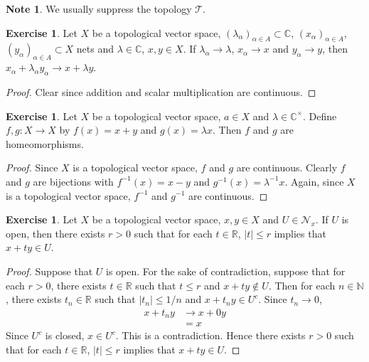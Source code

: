 \documentclass[12pt]{amsart}
\theoremstyle{definition}
\newtheorem{note}[definition]{Note}
\newtheorem{ex}[definition]{Exercise}
\newcommand{\al}{\alpha}
\newcommand{\lam}{\lambda}
\newcommand{\C}{\mathbb{C}}
\newcommand{\N}{\mathbb{N}}
\newcommand{\R}{\mathbb{R}}
\newcommand{\MN}{\mathcal{N}}
\newcommand{\MT}{\mathcal{T}}
\begin{document}
	\begin{note}
		We usually suppress the topology $\MT$.
	\end{note}

	\begin{ex}
		Let $X$ be a topological vector space, $(\lam_{\al})_{\al \in A} \subset \C$, $(x_{\al})_{\al \in A}$, $(y_{\al})_{\al \in A} \subset X$ nets and $\lam \in \C$, $x, y \in X$. If $\lam_{\al} \rightarrow \lam$, $x_{\al} \rightarrow x$ and $y_{\al} \rightarrow y$, then $x_{\al} + \lam_{\al}y_{\al} \rightarrow x + \lam y$.
	\end{ex}

	\begin{proof}
		Clear since addition and scalar multiplication are continuous.
	\end{proof}
	
	\begin{ex}
		Let $X$ be a topological vector space, $a \in X$ and $\lam \in \C^{\times}$. Define $f,g: X \rightarrow X$ by $f(x) = x + y$ and $g(x) = \lam x$. Then $f$ and $g$ are homeomorphisms. 
	\end{ex}
	
	\begin{proof}
		Since $X$ is a topological vector space, $f$ and $g$ are continuous. Clearly $f$ and $g$ are bijections with $f^{-1}(x) = x - y$ and $g^{-1}(x) = \lam^{-1}x$. Again, since $X$ is a topological vector space, $f^{-1}$ and $g^{-1}$ are continuous.
	\end{proof}

	\begin{ex}
		Let $X$ be a topological vector space, $x,y \in X$ and $U \in \MN_x$. If $U$ is open, then there exists $r >0$ such that for each $t \in \R$, $|t| \leq r$ implies that $x+ ty \in U$.
	\end{ex}

	\begin{proof}
		Suppose that $U$ is open. For the sake of contradiction, suppose that for each $r > 0$, there exists $t \in \R$ such that $t \leq r$ and $x+ ty \not \in U$. Then for each $n \in \N$, there exists $t_n \in \R$ such that $|t_n| \leq 1/n$ and $x + t_ny \in U^c$. Since $t_n \rightarrow 0$, 
		\begin{align*}
			x + t_ny 
			& \rightarrow x + 0y \\
			&= x
		\end{align*}
		Since $U^c$ is closed, $x \in U^c$. This is a contradiction. Hence there exists $r >0$ such that for each $t \in \R$, $|t| \leq r$ implies that $x+ ty \in U$.
	\end{proof}
\end{document}
